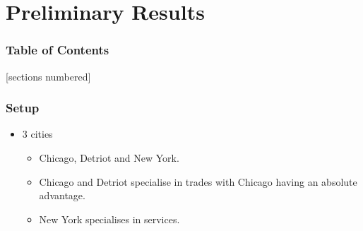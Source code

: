 \documentclass[serif, 9pt, aspectratio=32]{beamer}
\begin{document}
\section{Preliminary Results}

\begin{frame}
    \frametitle{Table of Contents}
    [sections numbered]
    \tableofcontents[currentsection]
\end{frame}

\begin{frame}
    \centering
    \frametitle{Setup}
    \begin{itemize}
        \setlength{\itemsep}{3em}
        \item 3 cities
              \begin{itemize}
                  \setlength{\itemsep}{1em}
                  \item Chicago, Detriot and New York.
                  \item Chicago and Detriot specialise in trades with Chicago having an absolute advantage.
                  \item New York specialises in services.
              \end{itemize}
    \end{itemize}
\end{frame}
\end{document}
